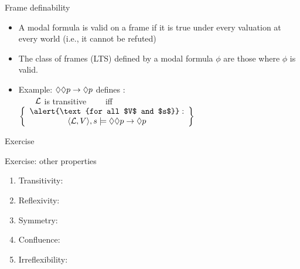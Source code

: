 \documentclass[aspectratio=169]{beamer}
\begin{document}
\begin{slide}{Frame definability}\label{s:32}
\small
\begin{itemize}
  \item A modal formula is valid on a frame if it is true under \alert{every valuation} at \alert{every world} (i.e., it cannot be refuted)
  \item The class of frames (LTS) defined by a modal formula $\phi$ are those where $\phi$ is valid.
  \item Example: $\Diamond\Diamond p \to \Diamond p$ defines :\\[5mm]
  ~~~~$\mathcal{L}$ is transitive ~~~~iff~~~~ 
      $\left\{\begin{array}{c}
        \alert{\text{for all $V$ and $s$}}:\\
        \pair{\ger{L},V},s\models \eventual\eventual p \to \eventual p
      \end{array}\right\}$
\end{itemize}
\end{slide}
\begin{slide}{Exercise}\label{s:32}
\small

\begin{exampleblock}{Exercise: other properties}
\begin{enumerate}
  \item Transitivity: 
  \item Reflexivity: 
  \item Symmetry:    
  \item Confluence:  
  \item Irreflexibility:  
\end{enumerate}
\end{exampleblock}

\end{slide}


  
\end{document}
